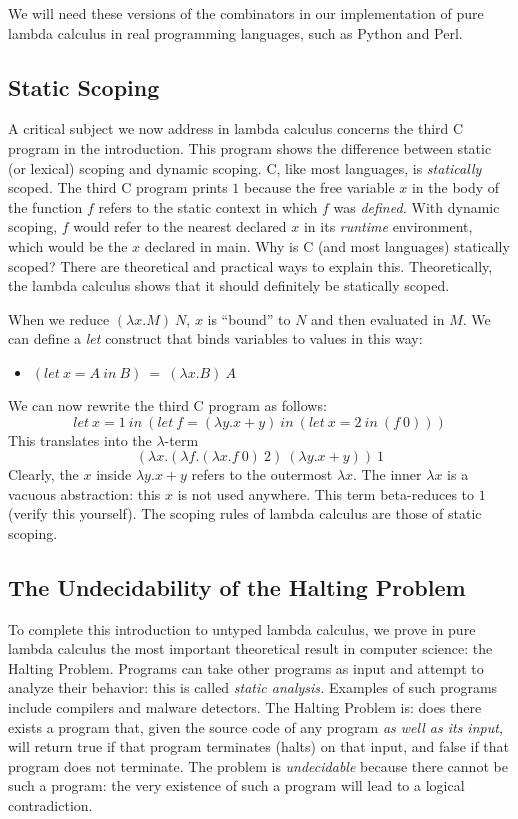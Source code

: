 We will need these versions of the combinators in our implementation of
pure lambda calculus in real programming languages, such as Python and Perl.

\subsection{Static Scoping}

A critical subject we now address in lambda calculus concerns the third C program in the
introduction.  This program shows the difference between static (or lexical)
scoping and dynamic scoping. C, like most languages, is {\em statically\/}
scoped.  The third C program prints $1$ because the free variable $x$ in the
body of the function $f$ refers to the static context in which $f$ was {\em defined.\/}  With dynamic scoping, $f$ would refer to the nearest declared $x$ in
its {\em runtime\/} environment, which would be the $x$ declared in main.
Why is C (and most languages) statically scoped?  There are theoretical and
practical ways to explain this.  Theoretically, the lambda calculus shows
that it should definitely be statically scoped.

When we reduce $(\lambda x.M)~N$, $x$ is ``bound'' to $N$ and
then evaluated in $M$.  We can define a {\em let\/} construct that binds
variables to values in this way:
\begin{itemize}
\item 
  $(let~ x=A~ in~ B) ~=~ (\lambda x.B)~A$
\end{itemize}
We can now rewrite the third C program as follows:
$$
let~x=1 ~in~ (let~ f=(\lambda y.x+y) ~in~ (let ~x=2~ in~
(f~0)))
$$
This translates into the $\lambda$-term
$$
(\lambda x. (\lambda f.(\lambda x.f~0)~ 2)~ (\lambda y.x+y))~ 1
$$
Clearly, the $x$ inside $\lambda y.x+y$ refers to the outermost $\lambda x$.
The inner $\lambda x$ is a vacuous abstraction: this $x$ is not used anywhere.
This term beta-reduces to $1$  (verify this yourself).
The scoping rules of lambda calculus are those of static scoping.


\subsection{The Undecidability of the Halting Problem}

To complete this introduction to untyped lambda calculus, we prove in
pure lambda calculus the most important theoretical result in computer
science: the Halting Problem.  Programs can take other programs as
input and attempt to analyze their behavior: this is called {\em
  static analysis.}  Examples of such programs include compilers and
malware detectors.  The Halting Problem is: does there exists a
program that, given the source code of any program {\em as well as its
  input,\/} will return true if that program terminates (halts) on
that input, and false if that program does not terminate.  The problem
is {\em undecidable\/} because there cannot be such a program: the
very existence of such a program will lead to a logical contradiction.

